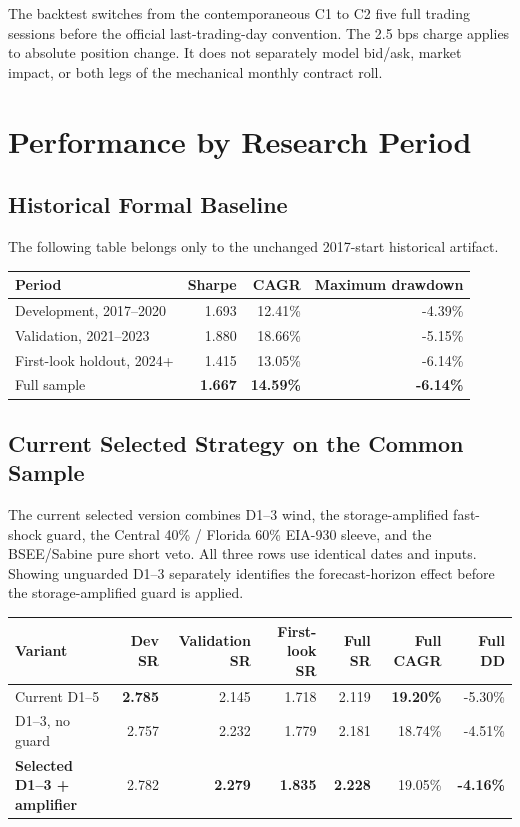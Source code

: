 \documentclass[11pt,a4paper]{article}
\begin{document}
The backtest switches from the contemporaneous C1 to C2 five full trading
sessions before the official last-trading-day convention. The 2.5 bps charge
applies to absolute position change. It does not separately model bid/ask,
market impact, or both legs of the mechanical monthly contract roll.

\section{Performance by Research Period}

\subsection{Historical Formal Baseline}

The following table belongs only to the unchanged 2017-start historical
artifact.

\begin{table}[h]
\centering
\begin{tabular}{lrrr}
\toprule
Period & Sharpe & CAGR & Maximum drawdown\\
\midrule
Development, 2017--2020 & 1.693 & 12.41\% & -4.39\%\\
Validation, 2021--2023 & 1.880 & 18.66\% & -5.15\%\\
First-look holdout, 2024+ & 1.415 & 13.05\% & -6.14\%\\
Full sample & \textbf{1.667} & \textbf{14.59\%} & \textbf{-6.14\%}\\
\bottomrule
\end{tabular}
\end{table}

\subsection{Current Selected Strategy on the Common Sample}

The current selected version combines D1--3 wind, the storage-amplified
fast-shock guard, the Central 40\% / Florida 60\% EIA-930 sleeve, and the
BSEE/Sabine pure short veto. All three rows use identical dates and inputs.
Showing unguarded D1--3 separately identifies the forecast-horizon effect
before the storage-amplified guard is applied.

\begin{table}[h]
\centering
\small
\begin{tabular}{lrrrrrr}
\toprule
Variant & Dev SR & Validation SR & First-look SR & Full SR & Full CAGR & Full DD\\
\midrule
Current D1--5 & \textbf{2.785} & 2.145 & 1.718 & 2.119 & \textbf{19.20\%} & -5.30\%\\
D1--3, no guard & 2.757 & 2.232 & 1.779 & 2.181 & 18.74\% & -4.51\%\\
\textbf{Selected D1--3 + amplifier} & 2.782 & \textbf{2.279} & \textbf{1.835} & \textbf{2.228} & 19.05\% & \textbf{-4.16\%}\\
\bottomrule
\end{tabular}
\end{table}
\end{document}
